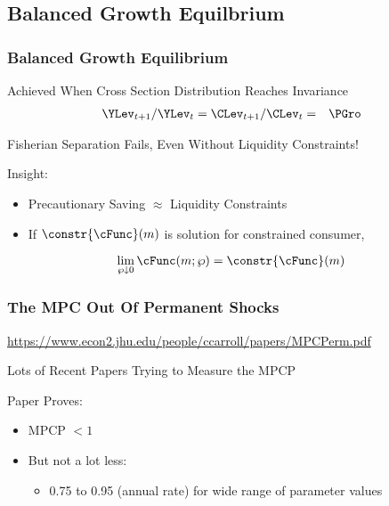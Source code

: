 \documentclass[pdflatex]{beamer}\providecommand{\texname}{BufferStockTheory-Slides}%
\begin{document}
\subsection{Balanced Growth Equilbrium}
\begin{frame}
\frametitle{Balanced Growth Equilibrium}

Achieved When Cross Section Distribution Reaches Invariance
\begin{eqnarray}
  \YLev_{t+1}/\YLev_{t} = \CLev_{t+1}/\CLev_{t} & = & \PGro
\end{eqnarray}

Fisherian Separation Fails, Even Without Liquidity Constraints!
\medskip\medskip

\pause Insight:
\begin{itemize}
\item  Precautionary Saving $\approx$ Liquidity Constraints
\item If $\constr{\cFunc}(m)$ is solution for constrained consumer, 
\end{itemize}
\pause
\begin{equation}
\lim_{ \wp \downarrow 0} \cFunc(m;\wp) = \constr{\cFunc}(m)
\end{equation}


\end{frame}

\begin{frame}
\frametitle{The MPC Out Of Permanent Shocks}

\url{https://www.econ2.jhu.edu/people/ccarroll/papers/MPCPerm.pdf}
\medskip

Lots of Recent Papers Trying to Measure the MPCP

\medskip
Paper Proves:

\begin{itemize}
\item MPCP $< 1$
\item But not a lot less:
\begin{itemize}
\item 0.75 to 0.95 (annual rate) for wide range of parameter values
\end{itemize}
\end{itemize}

\end{frame}
\end{document}

